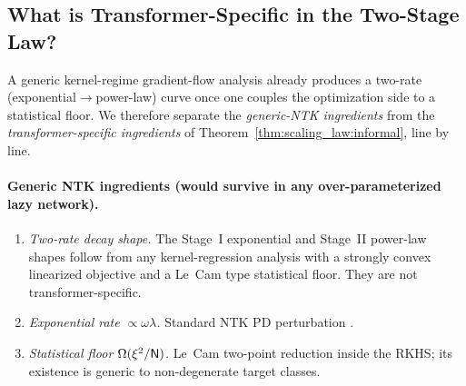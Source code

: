 \documentclass[11pt]{article}
\theoremstyle{plain}
\begin{document}
\subsection{What is Transformer-Specific in the Two-Stage Law?}\label{app_sub:what_is_transformer}

A generic kernel-regime gradient-flow analysis already produces a two-rate (exponential$\to$power-law) curve once one couples the optimization side to a statistical floor. We therefore separate the {\it generic-NTK ingredients} from the {\it transformer-specific ingredients} of Theorem~\ref{thm:scaling_law:informal}, line by line.

\paragraph{Generic NTK ingredients (would survive in any over-parameterized lazy network).}
\begin{enumerate}
    \item[(G1)] {\it Two-rate decay shape.} The Stage~I exponential and Stage~II power-law shapes follow from any kernel-regression analysis with a strongly convex linearized objective and a Le~Cam type statistical floor. They are not transformer-specific.
    \item[(G2)] {\it Exponential rate $\propto \omega\lambda$.} Standard NTK PD perturbation \citep{dzps19, dllw19, os20}.
    \item[(G3)] {\it Statistical floor $\Omega(\xi^2/{\sf N})$.} Le~Cam two-point reduction inside the RKHS; its existence is generic to non-degenerate target classes.
\end{enumerate}
\end{document}
